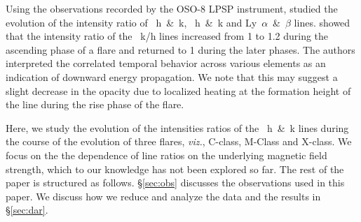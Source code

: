 Using the observations recorded by the OSO-8 LPSP instrument, \citep{lemaire84} studied the evolution of the intensity ratio of ~h~\&~k, ~h~\&~k and Ly~$\alpha$~\&~$\beta$ lines. \cite{lemaire84} showed that the intensity ratio of the ~k/h lines increased from 1 to 1.2 during the ascending phase of a flare and returned to 1 during the later phases. The authors interpreted the correlated temporal behavior across various elements as an indication of downward energy propagation. We note that this may suggest a slight decrease in the opacity due to localized heating at the formation height of the  line during the rise phase of the flare.


Here, we study the evolution of the intensities ratios of the ~h~\&~k lines during the course of the evolution of three flares, \textit{viz.}, C-class, M-Class and X-class. We focus on the the dependence of line ratios on the underlying magnetic field strength, which to our knowledge has not been explored so far. The rest of the paper is structured as follows. \S\ref{sec:obs} discusses the observations used in this paper. We discuss how we reduce and analyze the data and the results in \S\ref{sec:dar}.